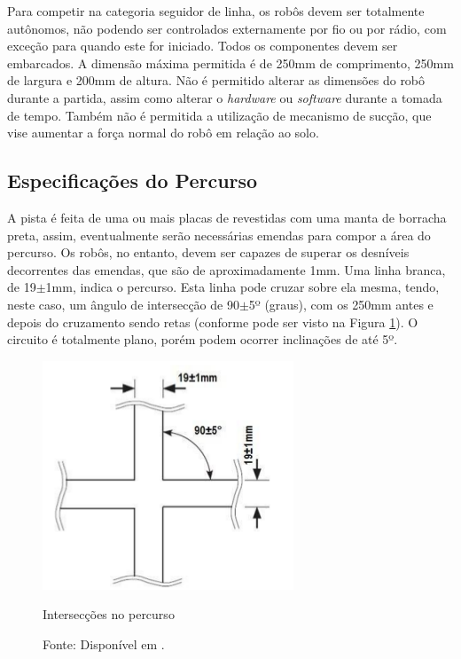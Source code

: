 Para competir na categoria seguidor de linha, os robôs devem ser totalmente autônomos, não podendo ser controlados 
externamente por fio ou por rádio, com exceção para quando este for iniciado. Todos os componentes devem ser embarcados. A 
dimensão máxima permitida é de 250mm   de   comprimento,   250mm   de   largura   e   200mm   de   altura. Não é 
permitido alterar as dimensões do robô durante a partida, assim como alterar o \textit{hardware} ou \textit{software} 
durante a tomada de tempo. Também não é permitida a utilização de mecanismo de sucção, 
que vise aumentar a força normal do robô em relação ao solo.

\vspace{1cm}
\subsection{Especificações do Percurso} \label{cap:perc_robocore}

A pista é feita de uma ou mais placas de  revestidas com uma manta de 
borracha preta, assim, eventualmente serão necessárias emendas para compor a área do percurso. Os robôs, no entanto, 
devem ser capazes de superar os desníveis decorrentes das emendas, que são de aproximadamente 1mm.
Uma linha branca, de 19$\pm$1mm, indica o percurso. Esta linha pode cruzar sobre ela mesma, tendo, neste caso, 
um ângulo de intersecção de 90$\pm$5º (graus), com os 250mm antes e depois do cruzamento sendo retas (conforme pode 
ser visto na Figura \ref{fig:percurso1}). O circuito é totalmente plano, porém podem ocorrer 
inclinações de até 5º.\par



\begin{figure}[h!]
 \centering
 \captionsetup{width=0.37\textwidth,font=footnotesize,textfont=bf}
 \includegraphics[scale=0.6]{figuras/Percurso1.png}
 \caption{Intersecções no percurso \label{fig:percurso1}}
 \vspace{-0.7cm}
 \caption*{Fonte: Disponível em \cite[p.4]{RegrasRobocore}.}
\end{figure}






